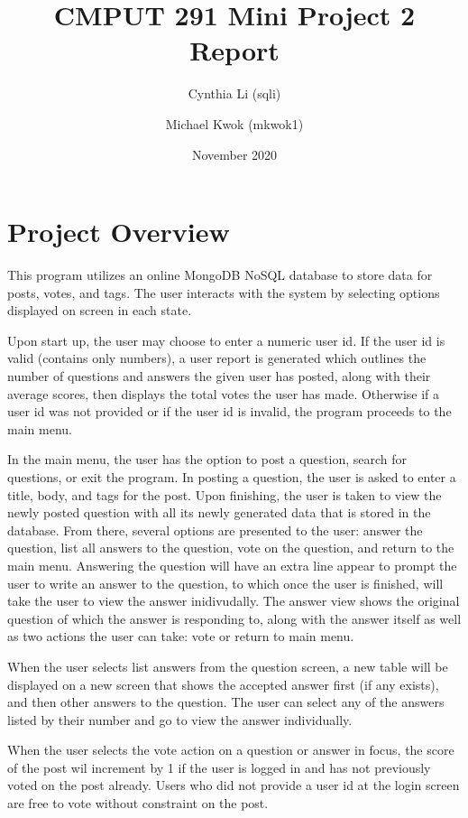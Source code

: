 \documentclass{article}
\title{CMPUT 291 Mini Project 2 Report}
\date{November 2020}
\author{Cynthia Li (sqli)\\
\and Michael Kwok (mkwok1)}
\begin{document}
\maketitle

\section{Project Overview}

This program utilizes an online MongoDB NoSQL database to store data for posts, votes, and tags. The user interacts with the system by selecting options displayed on screen in each state. 

Upon start up, the user may choose to enter a numeric user id. If the user id is valid (contains only numbers), a user report is generated which outlines the number of questions and answers the given user has posted, along with their average scores, then displays the total votes the user has made. Otherwise if a user id was not provided or if the user id is invalid, the program proceeds to the main menu.

In the main menu, the user has the option to post a question, search for questions, or exit the program. In posting a question, the user is asked to enter a title, body, and tags for the post. Upon finishing, the user is taken to view the newly posted question with all its newly generated data that is stored in the database. From there, several options are presented to the user: answer the question, list all answers to the question, vote on the question, and return to the main menu. Answering the question will have an extra line appear to prompt the user to write an answer to the question, to which once the user is finished, will take the user to view the answer inidivudally. The answer view shows the original question of which the answer is responding to, along with the answer itself as well as two actions the user can take: vote or return to main menu.

When the user selects list answers from the question screen, a new table will be displayed on a new screen that shows the accepted answer first (if any exists), and then other answers to the question. The user can select any of the answers listed by their number and go to view the answer individually.

When the user selects the vote action on a question or answer in focus, the score of the post wil increment by 1 if the user is logged in and has not previously voted on the post already. Users who did not provide a user id at the login screen are free to vote without constraint on the post.
\end{document}
